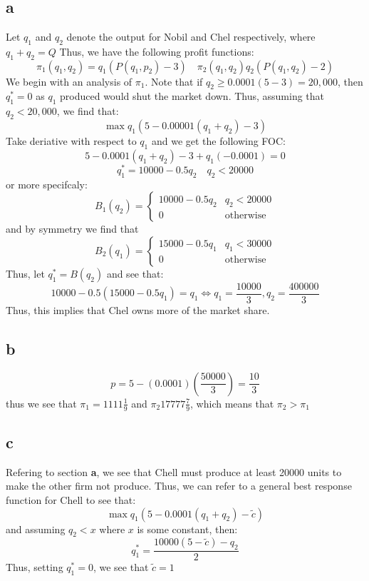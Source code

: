 \documentclass[11pt]{article}
\begin{document}
\section{}
\subsection*{a}
Let $q_1$ and $q_2$ denote the output for Nobil and Chel respectively, where $q_1 + q_2 = Q$ Thus, we have the following profit functions:
\[
\pi_1(q_1, q_2) = q_1(P(q_1, p_2) - 3) \quad \pi_2 (q_1, q_2) q_2(P(q_1,q_2) - 2)
\]
We begin with an analysis of $\pi_1$. Note that if $q_2 \geq 0.0001(5-3) = 20,000$, then $q_1^* = 0$ as $q_1$ produced would shut the market down. Thus, assuming that $q_2 < 20,000$,
we find that:
\[
\max q_1(5-0.00001(q_1 + q_2) - 3)
\]
Take deriative with respect to $q_1$ and we get the following FOC:
\[
5 - 0.0001(q_1 + q_2) - 3 + q_1(-0.0001) = 0
\]
\[
q_1^* = 10000 -0.5q_2 \quad q_2 < 20000
\]
or more specifcaly:
\[
B_1(q_2) = \begin{cases}
    10000 -0.5q_2 & q_2 < 20000\\
    0 & \text{otherwise}
\end{cases}
\]
and by symmetry we find that 
\[
B_2(q_1) = \begin{cases}
    15000 - 0.5q_1 & q_1 < 30000\\
    0 & \text{otherwise}
\end{cases}
\]
Thus, let $q_1^* = B(q_2)$ and see that:
\[
10000 -0.5(15000 -0.5q_1) = q_1 \iff q_1 = \frac{10000}{3}, q_2 = \frac{400000}{3}
\]
Thus, this implies that Chel owns more of the market share. 
\subsection*{b}
\[
p = 5 - (0.0001)\left( \frac{50000}{3} \right) = \frac{10}{3}
\]
thus we see that $\pi_1 = 1111 \frac{1}{9}$ and $\pi_2 17777\frac{7}{9}$, which means that $\pi_2 > \pi_1$
\subsection*{c}
Refering to section \textbf{a}, we see that Chell must produce at least 20000 units to make the other firm not produce. Thus, we can refer to a general best response function for Chell to see that:
\[
\max q_1(5-0.0001(q_1+q_2) - \tilde{c}) 
\]
and assuming $q_2 < x$ where $x$ is some constant, then:
\[
q_1^* = \frac{10000(5-\tilde{c}) - q_2}{2}
\]
Thus, setting $q_1^* = 0$, we see that $\tilde{c} = 1$



\section{}
\section{}
\end{document}
